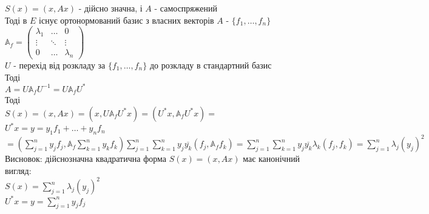 \documentclass[a4paper, 14pt]{extarticle}
\def\huge{\displaystyle}
\begin{document}
$S(x) = (x,Ax)$ - дійсно значна, і $A$ - самоспряжений\\
Тоді в $E$ існує ортонормований базис з власних векторів $A$ - $\{f_1,\dots,f_n\}$\\
$\mathbb{A}_f = \begin{pmatrix}
\lambda_1 & \dots & 0 \\
\vdots & \ddots & \vdots \\
0 & \dots & \lambda_n
\end{pmatrix}$\\
$U$ - перехід від розкладу за $\{f_1,\dots,f_n\}$ до розкладу в стандартний базис\\
Тоді\\
$A = U \mathbb{A}_{f} U^{-1} = U \mathbb{A}_{f} U^{*}$\\
Тоді\\
$S(x) = (x,Ax) = (x,U \mathbb{A}_{f} U^{*} x) = (U^*x, \mathbb{A}_{f} U^{*} x) =$\\
$U^* x = y = y_1f_1 + \dots + y_nf_n$\\
$= \huge \left(\sum_{j=1}^n y_jf_j, \mathbb{A}_{f} \sum_{k=1}^n y_k f_k \right) \sum_{j=1}^n \sum_{k=1}^n y_j \overline{y_k} (f_j, \mathbb{A}_f f_k) = \sum_{j=1}^n \sum_{k=1}^n y_j \overline{y_k} \lambda_k (f_j,f_k) = \sum_{j=1}^n \lambda_j (y_j)^2$\\
Висновок: дійснозначна квадратична форма $S(x) = (x,Ax)$ має канонічний вигляд:\\
$S(x) = \huge \sum_{j=1}^n \lambda_j (y_j)^2$\\
$U^*x = y = \huge \sum_{j=1}^n y_j f_j$\\
\end{document}
